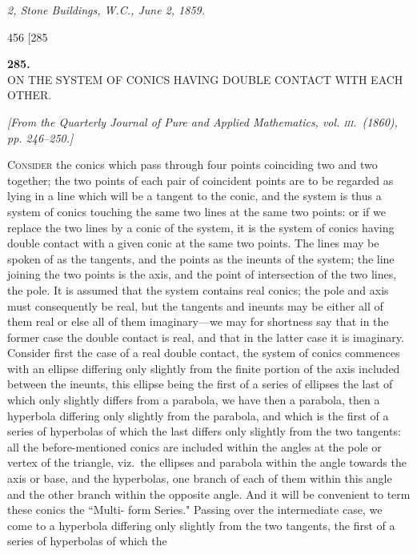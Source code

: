\documentclass[11pt]{article}
\begin{document}
\smallskip

\hfill\textit{2, Stone Buildings, W.C., June 2, 1859.}

\vfill

\newpage
\begin{center}
456 \hfill \textsc{[285}
\end{center}

\bigskip

\begin{center}
\textbf{\large 285.}\\[1ex]
\textsc{ON THE SYSTEM OF CONICS HAVING DOUBLE CONTACT WITH EACH OTHER.}
\end{center}

\begin{center}
\textit{[From the Quarterly Journal of Pure and Applied Mathematics, vol. \textsc{iii}.\ (1860),
pp. 246--250.]}
\end{center}

\medskip

\textsc{Consider} the conics which pass through four points coinciding two and two
together; the two points of each pair of coincident points are to be regarded as lying in
a line which will be a tangent to the conic, and the system is thus a system of conics
touching the same two lines at the same two points: or if we replace the two lines by a
conic of the system, it is the system of conics having double contact with a given conic
at the same two points. The lines may be spoken of as the tangents, and the points
as the ineunts of the system; the line joining the two points is the axis, and the
point of intersection of the two lines, the pole. It is assumed that the system contains
real conics; the pole and axis must consequently be real, but the tangents and ineunts
may be either all of them real or else all of them imaginary---we may for shortness
say that in the former case the double contact is real, and that in the latter case it
is imaginary. Consider first the case of a real double contact, the system of conics
commences with an ellipse differing only slightly from the finite portion of the axis
included between the ineunts, this ellipse being the first of a series of ellipses the last
of which only slightly differs from a parabola, we have then a parabola, then a
hyperbola differing only slightly from the parabola, and which is the first of a series
of hyperbolas of which the last differs only slightly from the two tangents: all the
before-mentioned conics are included within the angles at the pole or vertex of the
triangle, viz.\ the ellipses and parabola within the angle towards the axis or base, and
the hyperbolas, one branch of each of them within this angle and the other branch
within the opposite angle. And it will be convenient to term these conics the ``Multi-
form Series." Passing over the intermediate case, we come to a hyperbola differing
only slightly from the two tangents, the first of a series of hyperbolas of which the
\end{document}
